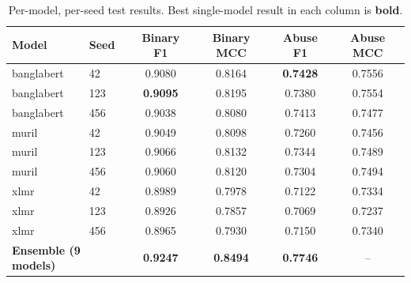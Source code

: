 \begin{table}[t]
\centering
\caption{Per-model, per-seed test results. Best single-model result in each column is \textbf{bold}.}
\label{tab:permodel}
\begin{tabular}{llcccc}
\toprule
\textbf{Model} & \textbf{Seed} & \textbf{Binary F1} & \textbf{Binary MCC} & \textbf{Abuse F1} & \textbf{Abuse MCC} \\
\midrule
banglabert   &  42 & 0.9080 & 0.8164 & \textbf{0.7428} & 0.7556 \\
banglabert   & 123 & \textbf{0.9095} & 0.8195 & 0.7380 & 0.7554 \\
banglabert   & 456 & 0.9038 & 0.8080 & 0.7413 & 0.7477 \\
muril        &  42 & 0.9049 & 0.8098 & 0.7260 & 0.7456 \\
muril        & 123 & 0.9066 & 0.8132 & 0.7344 & 0.7489 \\
muril        & 456 & 0.9060 & 0.8120 & 0.7304 & 0.7494 \\
xlmr         &  42 & 0.8989 & 0.7978 & 0.7122 & 0.7334 \\
xlmr         & 123 & 0.8926 & 0.7857 & 0.7069 & 0.7237 \\
xlmr         & 456 & 0.8965 & 0.7930 & 0.7150 & 0.7340 \\
\midrule
\multicolumn{2}{l}{\textbf{Ensemble (9 models)}} & \textbf{0.9247} & \textbf{0.8494} & \textbf{0.7746} & -- \\
\bottomrule
\end{tabular}
\end{table}